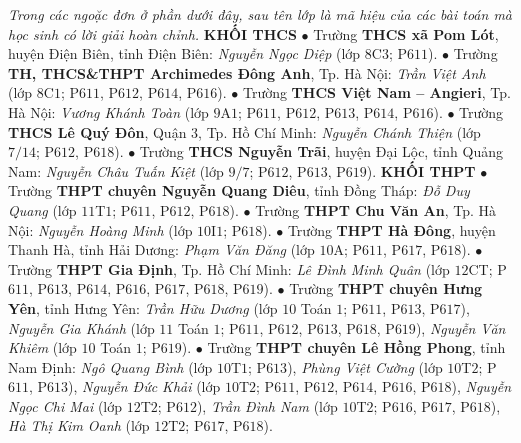 \begin{multicols}{2}
	\textit{Trong các ngoặc đơn ở phần dưới đây, sau tên lớp là mã hiệu của các bài toán mà học sinh có lời giải hoàn chỉnh.}
	\vskip 0.05cm
	\textbf{\color{thachthuctoanhoc}KHỐI THCS}
	\vskip 0.05cm
	$\bullet$ Trường \textbf{\color{thachthuctoanhoc}THCS xã Pom Lót}, huyện Điện Biên, tỉnh Điện Biên: \textit{Nguyễn Ngọc Diệp} (lớp $8$C$3$; P$611$).
	\vskip 0.05cm
	$\bullet$ Trường \textbf{\color{thachthuctoanhoc}TH, THCS\&THPT Archimedes Đông Anh}, Tp. Hà Nội:  \textit{Trần Việt Anh} (lớp $8$C$1$; P$611$, P$612$, P$614$, P$616$).
	\vskip 0.05cm
	$\bullet$ Trường \textbf{\color{thachthuctoanhoc}THCS Việt Nam -- Angieri}, Tp. Hà Nội: \textit{Vương Khánh Toàn} (lớp $9$A$1$; P$611$, P$612$, P$613$, P$614$, P$616$).
	\vskip 0.05cm
	$\bullet$ Trường \textbf{\color{thachthuctoanhoc}THCS Lê Quý Đôn}, Quận $3$, Tp. Hồ Chí Minh: \textit{Nguyễn Chánh Thiện} (lớp $7/14$; P$612$, P$618$).
	\vskip 0.05cm
	$\bullet$ Trường \textbf{\color{thachthuctoanhoc}THCS Nguyễn Trãi}, huyện Đại Lộc, tỉnh Quảng Nam: \textit{Nguyễn Châu Tuấn Kiệt} (lớp $9/7$; P$612$, P$613$, P$619$).
	\vskip 0.05cm
	\textbf{\color{thachthuctoanhoc}KHỐI THPT}
	\vskip 0.05cm
	$\bullet$ Trường \textbf{\color{thachthuctoanhoc}THPT chuyên Nguyễn Quang Diêu}, tỉnh Đồng Tháp: \textit{Đỗ Duy Quang} (lớp $11$T$1$; P$611$, P$612$, P$618$).
	\vskip 0.05cm
	$\bullet$ Trường \textbf{\color{thachthuctoanhoc}THPT Chu Văn An}, Tp. Hà Nội: \textit{Nguyễn Hoàng Minh} (lớp $10$I$1$; P$618$).
	\vskip 0.05cm
	$\bullet$ Trường \textbf{\color{thachthuctoanhoc}THPT Hà Đông}, huyện Thanh Hà, tỉnh Hải Dương: \textit{Phạm Văn Đăng} (lớp $10$A; P$611$, P$617$, P$618$).
	\vskip 0.05cm
	$\bullet$ Trường \textbf{\color{thachthuctoanhoc}THPT Gia Định}, Tp. Hồ Chí Minh: \textit{Lê Đình Minh Quân} (lớp $12$CT; P$611$, P$613$, P$614$, P$616$, P$617$, P$618$, P$619$).
	\vskip 0.05cm
	$\bullet$ Trường \textbf{\color{thachthuctoanhoc}THPT chuyên Hưng Yên}, tỉnh Hưng Yên: \textit{Trần Hữu Dương} (lớp $10$ Toán $1$; P$611$, P$613$, P$617$), \textit{Nguyễn Gia Khánh} (lớp $11$ Toán $1$; P$611$, P$612$, P$613$, P$618$, P$619$), \textit{Nguyễn Văn Khiêm} (lớp $10$ Toán $1$; P$619$).
	\vskip 0.05cm
	$\bullet$ Trường \textbf{\color{thachthuctoanhoc}THPT chuyên Lê Hồng Phong}, tỉnh Nam Định: \textit{Ngô Quang Bình} (lớp $10$T$1$; P$613$), \textit{Phùng Việt Cường} (lớp $10$T$2$; P$611$, P$613$), \textit{Nguyễn Đức Khải} (lớp $10$T$2$; P$611$, P$612$, P$614$, P$616$, P$618$), \textit{Nguyễn Ngọc Chi Mai} (lớp $12$T$2$; P$612$), \textit{Trần Đình Nam} (lớp $10$T$2$; P$616$, P$617$, P$618$), \textit{Hà Thị Kim Oanh} (lớp $12$T$2$; P$617$, P$618$).

\end{multicols}

